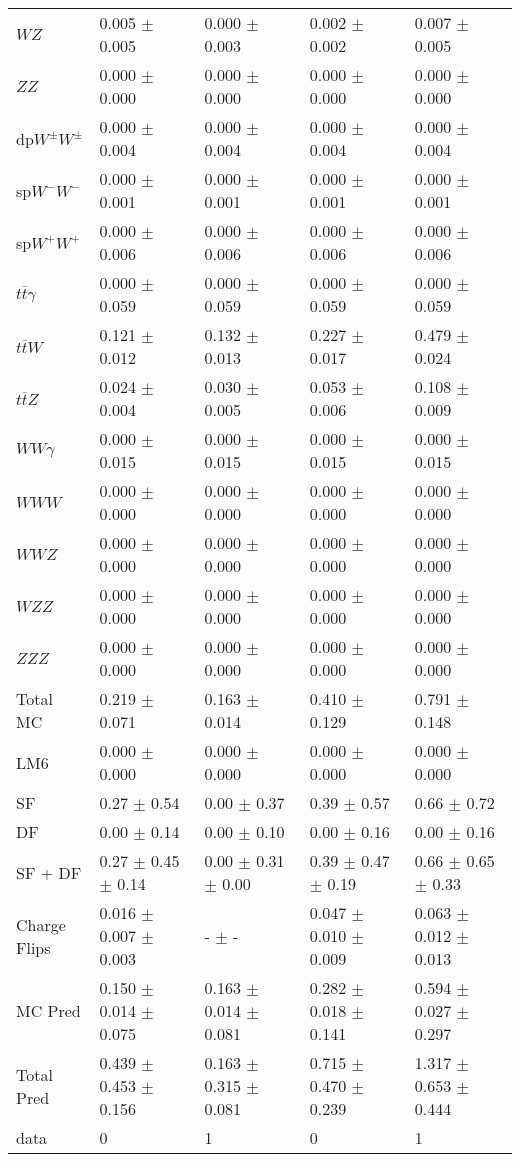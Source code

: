 \begin{tabular}{l | l l l l}
$WZ$ &  0.005 $\pm$  0.005 &  0.000 $\pm$  0.003 &  0.002 $\pm$  0.002 &  0.007 $\pm$  0.005\\
$ZZ$ &  0.000 $\pm$   0.000 &  0.000 $\pm$   0.000 &  0.000 $\pm$   0.000 &  0.000 $\pm$   0.000\\
\hline
dp$W^{\pm}W^{\pm}$ &  0.000 $\pm$  0.004 &  0.000 $\pm$  0.004 &  0.000 $\pm$  0.004 &  0.000 $\pm$  0.004\\
sp$W^{-}W^{-}$ &  0.000 $\pm$  0.001 &  0.000 $\pm$  0.001 &  0.000 $\pm$  0.001 &  0.000 $\pm$  0.001\\
sp$W^{+}W^{+}$ &  0.000 $\pm$  0.006 &  0.000 $\pm$  0.006 &  0.000 $\pm$  0.006 &  0.000 $\pm$  0.006\\
$t\overline{t}\gamma$ &  0.000 $\pm$  0.059 &  0.000 $\pm$  0.059 &  0.000 $\pm$  0.059 &  0.000 $\pm$  0.059\\
$t\overline{t}W$ &  0.121 $\pm$  0.012 &  0.132 $\pm$  0.013 &  0.227 $\pm$  0.017 &  0.479 $\pm$  0.024\\
$t\overline{t}Z$ &  0.024 $\pm$  0.004 &  0.030 $\pm$  0.005 &  0.053 $\pm$  0.006 &  0.108 $\pm$  0.009\\
$WW\gamma$ &  0.000 $\pm$  0.015 &  0.000 $\pm$  0.015 &  0.000 $\pm$  0.015 &  0.000 $\pm$  0.015\\
$WWW$ &  0.000 $\pm$   0.000 &   0.000 $\pm$   0.000 &   0.000 $\pm$   0.000 &   0.000 $\pm$   0.000\\
$WWZ$ &  0.000 $\pm$   0.000 &  0.000 $\pm$   0.000 &  0.000 $\pm$   0.000 &  0.000 $\pm$   0.000\\
$WZZ$ &  0.000 $\pm$   0.000 &  0.000 $\pm$   0.000 &  0.000 $\pm$   0.000 &  0.000 $\pm$   0.000\\
$ZZZ$ &  0.000 $\pm$   0.000 &   0.000 $\pm$   0.000 &   0.000 $\pm$   0.000 &   0.000 $\pm$   0.000\\
\hline
Total MC &  0.219 $\pm$  0.071 &  0.163 $\pm$  0.014 &  0.410 $\pm$  0.129 &  0.791 $\pm$  0.148\\
\hline\hline
\hline
LM6 &  0.000 $\pm$  0.000 &  0.000 $\pm$  0.000 &  0.000 $\pm$  0.000 &  0.000 $\pm$  0.000\\
\hline\hline
\hline\hline
 SF  & 0.27 $\pm$ 0.54 & 0.00 $\pm$ 0.37 & 0.39 $\pm$ 0.57 & 0.66 $\pm$ 0.72\\
 DF  & 0.00 $\pm$ 0.14 & 0.00 $\pm$ 0.10 & 0.00 $\pm$ 0.16 & 0.00 $\pm$ 0.16\\
\hline
 SF + DF  & 0.27 $\pm$ 0.45 $\pm$ 0.14 & 0.00 $\pm$ 0.31 $\pm$ 0.00 & 0.39 $\pm$ 0.47 $\pm$ 0.19 & 0.66 $\pm$ 0.65 $\pm$ 0.33\\
\hline\hline
Charge Flips & 0.016 $\pm$ 0.007 $\pm$ 0.003 & - $\pm$ - & 0.047 $\pm$ 0.010 $\pm$ 0.009 & 0.063 $\pm$ 0.012 $\pm$ 0.013\\
\hline\hline
\hline
MC Pred &  0.150 $\pm$  0.014 $\pm$  0.075 &  0.163 $\pm$  0.014 $\pm$  0.081 &  0.282 $\pm$  0.018 $\pm$  0.141 &  0.594 $\pm$  0.027 $\pm$  0.297\\
\hline\hline
Total Pred &  0.439 $\pm$  0.453 $\pm$  0.156 &  0.163 $\pm$  0.315 $\pm$  0.081 &  0.715 $\pm$  0.470 $\pm$  0.239 &  1.317 $\pm$  0.653 $\pm$  0.444\\
\hline\hline
data & 0 & 1 & 0 & 1\\
\hline\hline
\end{tabular}
